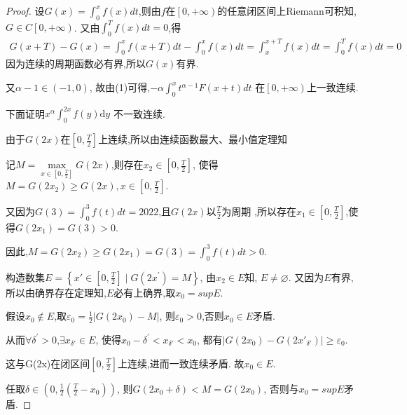 \documentclass[lang=cn,newtx,10pt,scheme=chinese]{../Template/elegantbook}
\begin{document}
\begin{proof}
设$G(x)=\int_0^x{f\left( x \right)}dt$,则由$f$在$\left[ 0,+\infty \right)$的任意闭区间上Riemann可积知,
$G\in C\left[ 0,+\infty \right) $.
又由$\int_0^T{f\left( x \right)}dt=0$,得
\begin{equation}
\begin{split}
G\left( x+T \right) -G\left( x \right) =\int_0^x{f\left( x+T \right)}dt-\int_0^x{f\left( x \right)}dt=\int_x^{x+T}{f\left( x \right)}dt=\int_0^T{f\left( x \right)}dt=0
\end{split}
\nonumber
\end{equation}
因为连续的周期函数必有界,所以$G(x)$有界.

又$\alpha -1\in \left( -1,0 \right) $,
故由(1)可得,$-\alpha \int_0^x{t^{\alpha -1}F\left( x+t \right)}dt$
在$\left[ 0,+\infty \right) $上一致连续.

下面证明$x^{\alpha}\int_0^{2x}{f\left( y \right) \mathrm{d}y}$
不一致连续.

由于$G(2x)$在$\left[ 0,\frac{T}{2} \right] $上连续,所以由连续函数最大、最小值定理知

记$M=\underset{x\in \left[ 0,\frac{T}{2} \right]}{\max}G\left( 2x \right) $,则存在$x_2\in \left[ 0,\frac{T}{2} \right] $,
使得$M=G\left( 2x_2 \right) \geqslant G\left( 2x \right) ,x\in \left[ 0,\frac{T}{2} \right] $.

又因为$G(3)=\int_0^3{f\left( t \right) dt}=2022$,且$G(2x)$以$\frac{T}{2}$为周期
,所以存在$x_1\in \left[ 0,\frac{T}{2} \right] $,使得$G(2x_1)=G(3)>0$.

因此,$M=G{\left( 2x_2 \right)}\geqslant G(2x_1)=G\left( 3 \right) =\int_0^3{f\left( t \right) dt}>0$.

构造数集$E=\left\{ x'\in \left[ 0,\frac{T}{2} \right] \mid G\left( 2x^{\prime} \right) =M \right\} $,
由$x_2\in E$知,
$E\ne \varnothing $.
又因为$E$有界,所以由确界存在定理知,$E$必有上确界,取$x_0=supE$.

假设$x_0\notin E$,取$\varepsilon _0=\frac{1}{2}\left| G\left( 2x_0 \right) -M \right|$,
则$\varepsilon _0>0$,否则$x_0\in E$矛盾.

从而$\forall \delta ^{\prime}>0$,$\exists x_{\delta'}\in E$,
使得$ x_0-\delta ^{\prime}<x_{\delta'}<x_0$,
都有$\left| G\left( 2x_0 \right) -G\left( 2x'_{\delta'} \right) \right|\geqslant \varepsilon _0$.

这与G(2x)在闭区间$\left[ 0,\frac{T}{2} \right]$上连续,进而一致连续矛盾.
故$x_0\in E$.

任取$\delta \in \left( 0,\frac{1}{2}\left( \frac{T}{2}-x_0 \right) \right) $,
则$G\left( 2x_0+\delta \right) <M=G\left( 2x_0 \right) $,
否则与$x_0=supE$矛盾.


\end{proof}
\end{document}
